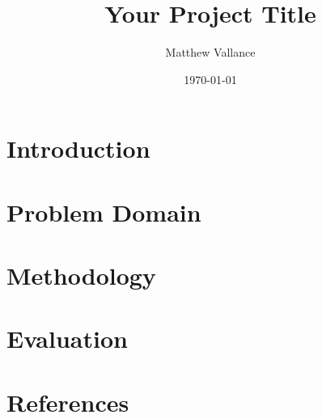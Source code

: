 \documentclass{article}
\begin{document}
\title{Your Project Title}
\author{Matthew Vallance}
\date{\today}

\maketitle

\section{Introduction}

\section{Problem Domain}

\parencite{johnson2019} %

\section{Methodology}

\section{Evaluation}

\section{References}

\printbibliography
\end{document}
